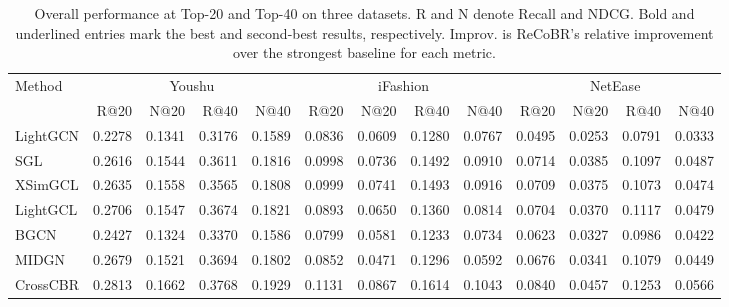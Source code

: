 \documentclass[letterpaper,journal]{IEEEtran}
\begin{document}
\begin{table}[!t]
    \centering
    \caption{Overall performance at Top-20 and Top-40 on three
    datasets. R and N denote Recall and NDCG. Bold and underlined
    entries mark the best and second-best results, respectively.
    Improv. is ReCoBR's relative improvement over the strongest
    baseline for each metric.}
    \label{tab:overall}
    {\small
    \setlength{\tabcolsep}{1mm}
    \begin{tabular}{@{}lrrrrrrrrrrrr@{}}
        \toprule
        \multirow{2}{*}{Method}
        & \multicolumn{4}{c}{Youshu}
        & \multicolumn{4}{c}{iFashion}
        & \multicolumn{4}{c}{NetEase} \\
        \cmidrule(lr){2-5}
        \cmidrule(lr){6-9}
        \cmidrule(lr){10-13}
        & R@20 & N@20 & R@40 & N@40
        & R@20 & N@20 & R@40 & N@40
        & R@20 & N@20 & R@40 & N@40 \\
        \midrule

        LightGCN
        & 0.2278 & 0.1341 & 0.3176 & 0.1589
        & 0.0836 & 0.0609 & 0.1280 & 0.0767
        & 0.0495 & 0.0253 & 0.0791 & 0.0333 \\

        SGL
        & 0.2616 & 0.1544 & 0.3611 & 0.1816
        & 0.0998 & 0.0736 & 0.1492 & 0.0910
        & 0.0714 & 0.0385 & 0.1097 & 0.0487 \\

        XSimGCL
        & 0.2635 & 0.1558 & 0.3565 & 0.1808
        & 0.0999 & 0.0741 & 0.1493 & 0.0916
        & 0.0709 & 0.0375 & 0.1073 & 0.0474 \\

        LightGCL
        & 0.2706 & 0.1547 & 0.3674 & 0.1821
        & 0.0893 & 0.0650 & 0.1360 & 0.0814
        & 0.0704 & 0.0370 & 0.1117 & 0.0479 \\
        \midrule

        BGCN
        & 0.2427 & 0.1324 & 0.3370 & 0.1586
        & 0.0799 & 0.0581 & 0.1233 & 0.0734
        & 0.0623 & 0.0327 & 0.0986 & 0.0422 \\

        MIDGN
        & 0.2679 & 0.1521 & 0.3694 & 0.1802
        & 0.0852 & 0.0471 & 0.1296 & 0.0592
        & 0.0676 & 0.0341 & 0.1079 & 0.0449 \\

        CrossCBR
        & 0.2813 & 0.1662 & 0.3768 & 0.1929
        & 0.1131 & 0.0867 & 0.1614 & 0.1043
        & 0.0840 & 0.0457 & 0.1253 & 0.0566 \\


\end{tabular}}
\end{table}
\end{document}
